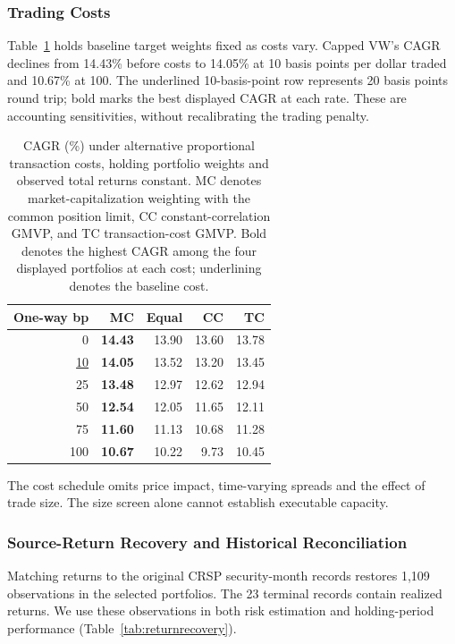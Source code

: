 \documentclass[letterpaper,journal]{IEEEtran}
\begin{document}
\subsubsection{Trading Costs}
Table~\ref{tab:cost} holds baseline target weights fixed as costs vary. Capped VW's CAGR declines from 14.43\% before costs to 14.05\% at 10 basis points per dollar traded and 10.67\% at 100. The underlined 10-basis-point row represents 20 basis points round trip; bold marks the best displayed CAGR at each rate. These are accounting sensitivities, without recalibrating the trading penalty.

\begin{table}[!htbp]\centering\caption{CAGR (\%) under alternative proportional transaction costs, holding portfolio weights and observed total returns constant. MC denotes market-capitalization weighting with the common position limit, CC constant-correlation GMVP, and TC transaction-cost GMVP. Bold denotes the highest CAGR among the four displayed portfolios at each cost; underlining denotes the baseline cost.}\label{tab:cost}
\small\begin{tabular}{rrrrr}\toprule
One-way bp & MC & Equal & CC & TC\\\midrule
0 & \textbf{14.43} & 13.90 & 13.60 & 13.78 \\
\underline{10} & \textbf{14.05} & 13.52 & 13.20 & 13.45 \\
25 & \textbf{13.48} & 12.97 & 12.62 & 12.94 \\
50 & \textbf{12.54} & 12.05 & 11.65 & 12.11 \\
75 & \textbf{11.60} & 11.13 & 10.68 & 11.28 \\
100 & \textbf{10.67} & 10.22 & 9.73 & 10.45 \\
\bottomrule\end{tabular}\end{table}

The cost schedule omits price impact, time-varying spreads and the effect of trade size. The size screen alone cannot establish executable capacity.

\subsubsection{Source-Return Recovery and Historical Reconciliation}\label{sec:returnrecovery}
Matching returns to the original CRSP security-month records restores 1,109 observations in the selected portfolios. The 23 terminal records contain realized returns. We use these observations in both risk estimation and holding-period performance (Table~\ref{tab:returnrecovery}).
\end{document}
